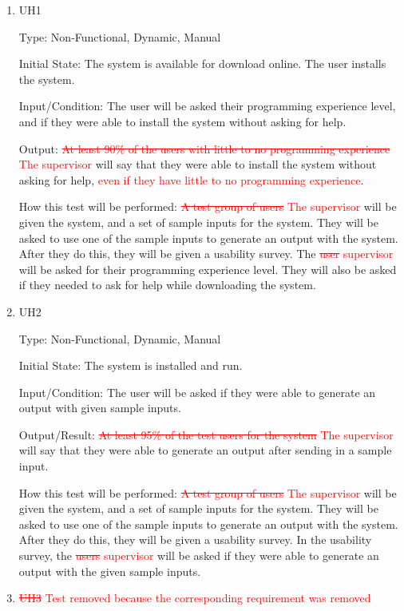 \documentclass[12pt, titlepage]{article}
\begin{document}
\begin{enumerate}

\item{UH1\\}\label{UH1}

Type: Non-Functional, Dynamic, Manual
					
Initial State: 
The system is available for download online. The user installs the system.

Input/Condition: 
The user will be asked their programming experience level, and if they were able to install the system without asking for help.	

Output: 
\textcolor{red}{\sout{At least 90\% of the users with little to no programming experience} The supervisor} will say that they were able to install the system without asking for help, \textcolor{red}{even if they have little to no programming experience}.

How this test will be performed: 
\textcolor{red}{\sout{A test group of users} The supervisor} will be given the system, and a set of sample inputs for the system. They will be asked to use one of the sample inputs to generate an output with the system. After they do this, they will be given a usability survey. The \textcolor{red}{\sout{user} supervisor} will be asked for their programming experience level. They will also be asked if they needed to ask for help while downloading the system.
\\
\item{UH2\\}\label{UH2}

Type: Non-Functional, Dynamic, Manual
					
Initial State: 
The system is installed and run.

Input/Condition: 
The user will be asked if they were able to generate an output with given sample inputs.

Output/Result: 
\textcolor{red}{\sout{At least 95\% of the test users for the system} The supervisor} will say that they were able to generate an output after sending in a sample input.
					
How this test will be performed:
\textcolor{red}{\sout{A test group of users} The supervisor} will be given the system, and a set of sample inputs for the system. They will be asked to use one of the sample inputs to generate an output with the system. After they do this, they will be given a usability survey. In the usability survey, the \textcolor{red}{\sout{users} supervisor} will be asked if they were able to generate an output with the given sample inputs.
\\
\item{{\textcolor{red}{\sout{UH3} Test removed because the corresponding requirement was removed}}\\}\label{UH3}


\end{enumerate}
\end{document}
